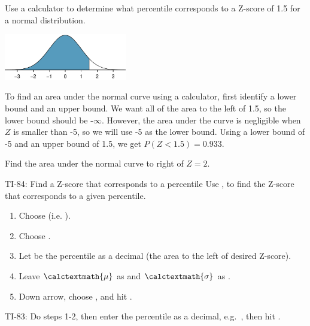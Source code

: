 \begin{examplewrap}
\begin{nexample}{Use a calculator to determine what percentile corresponds to a Z-score of 1.5 for a normal distribution.\footnotemark}

\includegraphics[width=0.4\textwidth]{ch_distributions/figures/zscoreleftof1point5/zscoreleftof1point5}\vspace{-2mm}

To find an area under the normal curve using a calculator, first identify a lower bound and an upper bound. We want all of the area to the left of 1.5, so the lower bound should be -$\infty$. However, the area under the curve is negligible when $Z$ is smaller than -5, so we will use -5 as the lower bound. Using a lower bound of -5 and an upper bound of 1.5, we get $P(Z < 1.5) = 0.933$.
\end{nexample}
\end{examplewrap}

\begin{exercisewrap}
\begin{nexercise}
Find the area under the normal curve to right of $Z=2$.~\footnotemark
\end{nexercise}
\end{exercisewrap}




\begin{onebox}{ TI-84: Find a Z-score that corresponds to a percentile}
\label{invNorm}
Use  ,  to find the Z-score that corresponds to a given percentile.
\begin{enumerate}
\setlength{\itemsep}{0mm}
\item Choose   (i.e. ).
\item Choose .
\item Let  be the percentile as a decimal (the area to the left of desired Z-score).
\item Leave $\calctextmath{\mu}$ as  and $\calctextmath{\sigma}$ as .
\item Down arrow, choose , and hit .\vspace{-1.5mm}
\end{enumerate}
TI-83: Do steps 1-2, then enter the percentile as a decimal, e.g.~\mbox{,} then hit .\end{onebox}

